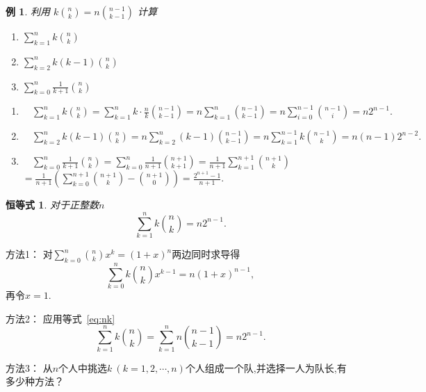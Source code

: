 \documentclass[punct]{ctexbeamer}
\newtheorem{iden}{恒等式}
\newtheorem{ex}{例}[section]
\begin{document}
\begin{frame}
    \begin{ex}
        利用 $k \binom{n}{k}=n\binom{n-1}{k-1}$ 计算
        \begin{enumerate}
            \item
            $\sum\limits_{k=1}^{n} k\binom{n}{k} $
            \item
            $\sum\limits_{k=2}^{n} k(k-1)\binom{n}{k}$

            \item
            $\sum\limits_{k=0}^{n} \frac{1}{k+1}\binom{n}{k}$
        \end{enumerate}
    \end{ex}

    \pause
    \begin{enumerate}
        \item  $\quad  \sum\limits_{k=1}^{n} k \binom{n}{k}
        =\sum\limits_{k=1}^{n} k \cdot \frac{n}{k}\binom{n-1}{k-1}
        =n \sum\limits_{k=1}^{n} \binom{n-1}{k-1}=n \sum\limits_{i=0}^{n-1} \binom{n-1}{i}=n  2^{n-1}.$

        \item
        $\quad \sum\limits_{k=2}^{n} k(k-1) \binom{n}{k}
        =n \sum\limits_{k=2}^{n}(k-1)  \binom{n-1}{k-1}=n \sum\limits_{k=1}^{n-1} k  \binom{n-1}{k}
        =n (n-1)  2^{n-2}.$

        \item

        $\quad  \sum\limits_{k=0}^{n} \frac{1}{k+1}\binom{n}{k}=\sum_{k=0}^{n} \frac{1}{n+1}\binom{n+1}{k+1}=\frac{1}{n+1} \sum\limits_{k=1}^{n+1}\binom{n+1}{k}$\\[6pt]
        $=\frac{1}{n+1}\left(\sum\limits_{k=0}^{n+1}\binom{n+1}{k} -\binom{n+1}{0}\right)=\frac{2^{n+1}-1}{n+1}.$
    \end{enumerate}

\end{frame}




\begin{frame}
	\begin{iden}
        对于正整数$n$
		$$\sum_{k=1}^{n} k\binom{n}{k}=n 2^{n-1}.$$
	\end{iden}
	\pause
方法1： 对$\sum _{k=0}^n  \binom{n}{k}x^{k}=(1+x)^{n}$两边同时求导得
		$$\sum _{k=0}^n  k\binom{n}{k}x^{k-1}=n(1+x)^{n-1},$$再令$x=1$.

方法2： 应用等式\, \ref{eq:nk}   $$\sum _{k=1}^n  k\binom{n}{k}=\sum _{k=1}^n  n\binom{n-1}{k-1}=n2^{n-1}.$$

方法3： 从$n$个人中挑选$k\ (k=1, 2, \cdots, n)$个人组成一个队,并选择一人为队长,有多少种方法？

\end{frame}
\end{document}
